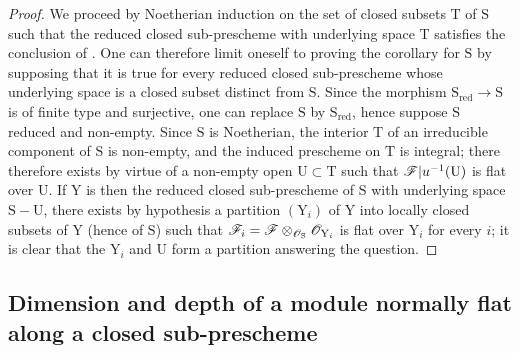 \begin{proof}
We proceed by Noetherian induction  on the set of closed subsets $\mathrm{T}$ of $\mathrm{S}$ such that the reduced closed sub-prescheme with underlying space $\mathrm{T}$ satisfies the conclusion of . One can therefore limit oneself to proving the corollary for $\mathrm{S}$ by supposing that it is true for every reduced closed sub-prescheme whose underlying space is a closed subset distinct from $\mathrm{S}$. Since the morphism $\mathrm{S}_\mathrm{red}\to\mathrm{S}$ is of finite type and surjective, one can replace $\mathrm{S}$ by $\mathrm{S}_\mathrm{red}$, hence suppose $\mathrm{S}$ reduced and non-empty. Since $\mathrm{S}$ is Noetherian, the interior $\mathrm{T}$ of an irreducible component of $\mathrm{S}$ is non-empty, and the induced prescheme on $\mathrm{T}$ is integral; there therefore exists by virtue of  a non-empty open $\mathrm{U}\subset\mathrm{T}$
such that $\mathscr{F}|u^{-1}(\mathrm{U})$ is flat over $\mathrm{U}$. If $\mathrm{Y}$ is then the reduced closed sub-prescheme of $\mathrm{S}$ with underlying space $\mathrm{S}-\mathrm{U}$, there exists by hypothesis a partition $(\mathrm{Y}_i)$ of $\mathrm{Y}$ into locally closed subsets of $\mathrm{Y}$ (hence of $\mathrm{S}$) such that $\mathscr{F}_i=\mathscr{F}\otimes_{\mathscr{O}_\mathrm{S}}\mathscr{O}_{\mathrm{Y}_i}$ is flat over $\mathrm{Y}_i$ for every $i$; it is clear that the $\mathrm{Y}_i$ and $\mathrm{U}$ form a partition answering the question.
\end{proof}

\subsection{Dimension and depth of a module normally flat along a closed sub-prescheme}
\label{subsection:IV.6.10}

